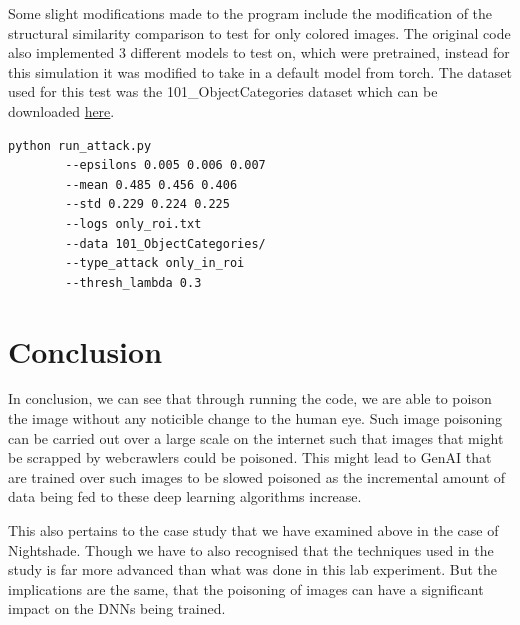 \documentclass{article}
\begin{document}
Some slight modifications made to the program include the modification of the
structural similarity comparison to test for only colored images. The original
code also implemented 3 different models to test on, which were pretrained,
instead for this simulation it was modified to take in a default model from torch.
The dataset used for this test was the 101\_ObjectCategories dataset which can
be downloaded \href{https://data.caltech.edu/records/mzrjq-6wc02}{here}.

\begin{lstlisting}[language=bash]
    python run_attack.py 
        --epsilons 0.005 0.006 0.007 
        --mean 0.485 0.456 0.406 
        --std 0.229 0.224 0.225 
        --logs only_roi.txt 
        --data 101_ObjectCategories/ 
        --type_attack only_in_roi 
        --thresh_lambda 0.3
\end{lstlisting}

\section{Conclusion}

In conclusion, we can see that through running the code, we are able to poison
the image without any noticible change to the human eye. Such image poisoning
can be carried out over a large scale on the internet such that images that might
be scrapped by webcrawlers could be poisoned. This might lead to GenAI that are
trained over such images to be slowed poisoned as the incremental amount of data being
fed to these deep learning algorithms increase.

This also pertains to the case study that we have examined above in the case of Nightshade. Though
we have to also recognised that the techniques used in the study is far more advanced than
what was done in this lab experiment. But the implications are the same, that the
poisoning of images can have a significant impact on the DNNs being trained.

\printbibliography
\nocite{khare2023SpotOn}
\nocite{li_andreeto_ranzato_perona_2022}
\end{document}
